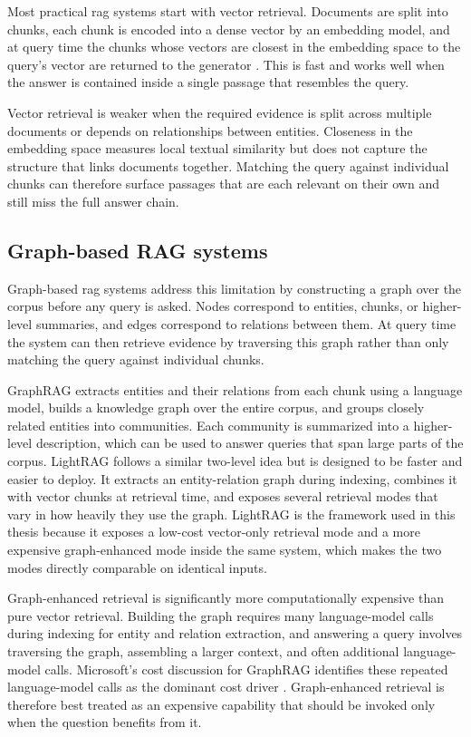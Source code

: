 \documentclass[english, bibtex]{kththesis}               %
\numberwithin{listing}{chapter}
\begin{document}
Most practical \gls{rag} systems start with vector retrieval. Documents are split into chunks, each chunk is encoded into a dense vector by an embedding model, and at query time the chunks whose vectors are closest in the embedding space to the query's vector are returned to the generator \cite{lewis2020rag,karpukhin2020dpr}. This is fast and works well when the answer is contained inside a single passage that resembles the query.

Vector retrieval is weaker when the required evidence is split across multiple documents or depends on relationships between entities. Closeness in the embedding space measures local textual similarity but does not capture the structure that links documents together. Matching the query against individual chunks can therefore surface passages that are each relevant on their own and still miss the full answer chain.

\subsection{Graph-based RAG systems}
\label{sec:backgroundGraphSystems}

Graph-based \gls{rag} systems address this limitation by constructing a graph over the corpus before any query is asked. Nodes correspond to entities, chunks, or higher-level summaries, and edges correspond to relations between them. At query time the system can then retrieve evidence by traversing this graph rather than only matching the query against individual chunks.

GraphRAG \cite{edge2024graphrag} extracts entities and their relations from each chunk using a language model, builds a knowledge graph over the entire corpus, and groups closely related entities into communities. Each community is summarized into a higher-level description, which can be used to answer queries that span large parts of the corpus. LightRAG \cite{lightrag2024} follows a similar two-level idea but is designed to be faster and easier to deploy. It extracts an entity-relation graph during indexing, combines it with vector chunks at retrieval time, and exposes several retrieval modes that vary in how heavily they use the graph. LightRAG is the framework used in this thesis because it exposes a low-cost vector-only retrieval mode and a more expensive graph-enhanced mode inside the same system, which makes the two modes directly comparable on identical inputs.

Graph-enhanced retrieval is significantly more computationally expensive than pure vector retrieval. Building the graph requires many language-model calls during indexing for entity and relation extraction, and answering a query involves traversing the graph, assembling a larger context, and often additional language-model calls. Microsoft's cost discussion for GraphRAG identifies these repeated language-model calls as the dominant cost driver \cite{edge2024graphrag,microsoft2024graphragcosts}. Graph-enhanced retrieval is therefore best treated as an expensive capability that should be invoked only when the question benefits from it.
\end{document}

